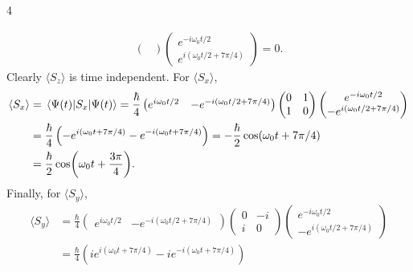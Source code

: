 \documentclass[11pt]{article}
\begin{document}
\begin{problem}{4}
\begin{enumerate}[label=(\alph*)]
\begin{answer}
\begin{equation}
\begin{aligned}
\begin{pmatrix}
 \end{pmatrix} \begin{pmatrix}
e^{-i\omega_0 t/2} \\
e^{i(\omega_0 t /2 + 7\pi/4)}
 \end{pmatrix} = 0.
          \end{aligned}
        \end{equation}
        Clearly \( \langle S_z \rangle \) is time independent.
        For \( \langle S_x \rangle \),
        \begin{equation}
        \label{eq:19}
        \begin{aligned}
          \langle S_x \rangle &= \ev{S_x}{\Psi(t)} = \frac{\hbar}{4} \begin{pmatrix}
e^{i\omega_0 t /2}  & -e^{-i(\omega_0 t/2 + 7\pi/4)}
 \end{pmatrix} \begin{pmatrix}
0  & 1 \\
1  & 0
 \end{pmatrix} \begin{pmatrix}
e^{-i\omega_0 t /2} \\
-e^{i(\omega_0 t /2 + 7\pi/4)}
 \end{pmatrix} \\
                  &= \frac{\hbar}{4} \left( -e^{i(\omega_0 t + 7\pi/4)} - e^{-i(\omega_0 t + 7\pi/4)} \right) = - \frac{\hbar}{2} \cos(\omega_0t + 7\pi/4) \\
                  &= \frac{\hbar}{2}\cos(\omega_0 t + \frac{3\pi}{4}).
        \end{aligned}
      \end{equation}
      Finally, for \(\langle S_y \rangle\),
      \begin{equation}
      \label{eq:20}
      \begin{aligned}
        \langle S_y \rangle &= \frac{\hbar}{4} \begin{pmatrix}
e^{i \omega_0 t /2}  & -e^{-i(\omega_0 t /2 + 7\pi/4)}
 \end{pmatrix} \begin{pmatrix}
0  & -i \\
i  & 0
 \end{pmatrix} \begin{pmatrix}
e^{-i\omega_{0} t /2} \\ -e^{i(\omega_0 t /2 + 7\pi/4)}
 \end{pmatrix} \\
                &= \frac{\hbar}{4} \left( ie^{i(\omega_0 t + 7\pi/4)} - ie^{-i(\omega_0 t + 7\pi/4)} \right) \\

\end{aligned}
\end{equation}
\end{answer}
\end{enumerate}
\end{problem}
\end{document}

